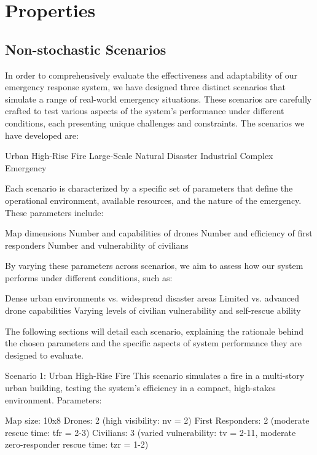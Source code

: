 
\section{Properties}

\subsection{Non-stochastic Scenarios}

In order to comprehensively evaluate the effectiveness and adaptability of our emergency response system, we have designed three distinct scenarios that simulate a range of real-world emergency situations. These scenarios are carefully crafted to test various aspects of the system's performance under different conditions, each presenting unique challenges and constraints.
The scenarios we have developed are:

Urban High-Rise Fire
Large-Scale Natural Disaster
Industrial Complex Emergency

Each scenario is characterized by a specific set of parameters that define the operational environment, available resources, and the nature of the emergency. These parameters include:

Map dimensions
Number and capabilities of drones
Number and efficiency of first responders
Number and vulnerability of civilians

By varying these parameters across scenarios, we aim to assess how our system performs under different conditions, such as:

Dense urban environments vs. widespread disaster areas
Limited vs. advanced drone capabilities
Varying levels of civilian vulnerability and self-rescue ability

The following sections will detail each scenario, explaining the rationale behind the chosen parameters and the specific aspects of system performance they are designed to evaluate.

Scenario 1: Urban High-Rise Fire
This scenario simulates a fire in a multi-story urban building, testing the system's efficiency in a compact, high-stakes environment.
Parameters:

Map size: 10x8
Drones: 2 (high visibility: nv = 2)
First Responders: 2 (moderate rescue time: tfr = 2-3)
Civilians: 3 (varied vulnerability: tv = 2-11, moderate zero-responder rescue time: tzr = 1-2)

